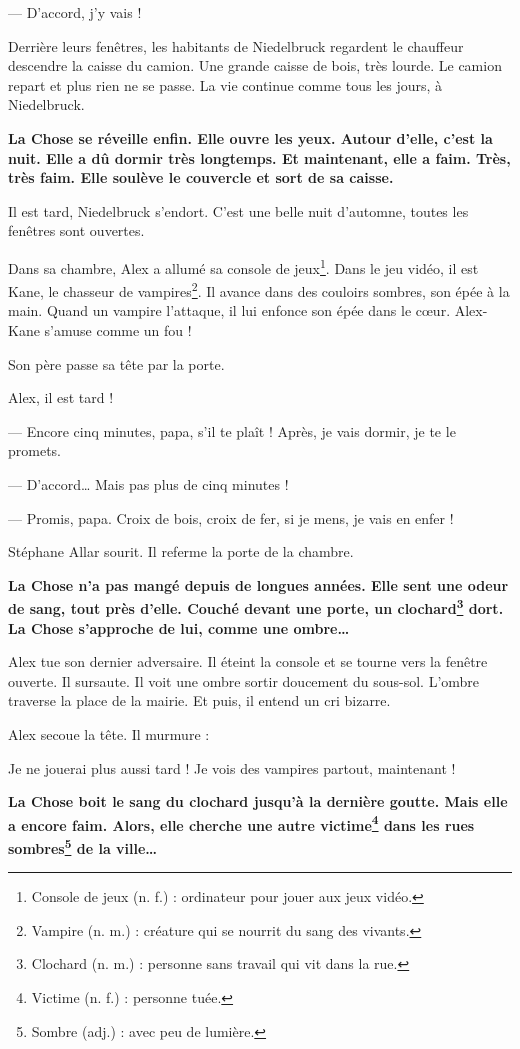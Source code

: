 --- D'accord, j'y vais ! \fg{}

Derrière leurs fenêtres, les habitants de Niedelbruck regardent le chauffeur descendre la caisse du camion. Une grande
caisse de bois, très lourde. Le camion repart et plus rien ne se passe. La vie continue comme tous les jours, à
Niedelbruck.

\textbf{La Chose se réveille enfin. Elle ouvre les yeux. Autour d'elle, c'est la nuit. Elle a dû dormir très longtemps. Et
maintenant, elle a faim. Très, très faim. Elle soulève le couvercle et sort de sa caisse.}

Il est tard, Niedelbruck s'endort. C'est une belle nuit d'automne, toutes les fenêtres sont ouvertes.

Dans sa chambre, Alex a allumé sa console de jeux\footnote{Console de jeux (n. f.) : ordinateur pour jouer aux jeux
vidéo.}. Dans le jeu vidéo, il est Kane, le chasseur de vampires\footnote{Vampire (n. m.) : créature qui se nourrit du
sang des vivants.}. Il avance dans des couloirs sombres, son épée à la main. Quand un vampire l'attaque, il lui enfonce
son épée dans le c\oe{}ur. Alex-Kane s'amuse comme un fou !

Son père passe sa tête par la porte.

\og Alex, il est tard !

--- Encore cinq minutes, papa, s'il te plaît ! Après, je vais dormir, je te le promets.

--- D'accord\ldots{} Mais pas plus de cinq minutes !

--- Promis, papa. Croix de bois, croix de fer, si je mens, je vais en enfer ! \fg{}

Stéphane Allar sourit. Il referme la porte de la chambre.

\textbf{La Chose n'a pas mangé depuis de longues années. Elle sent une odeur de sang, tout près d'elle. Couché devant une porte,
un clochard\footnote{Clochard (n. m.) : personne sans travail qui vit dans la rue.} dort. La Chose s'approche de lui,
comme une ombre\ldots{}}

Alex tue son dernier adversaire. Il éteint la console et se tourne vers la fenêtre ouverte. Il sursaute. Il voit une
ombre sortir doucement du sous-sol. L'ombre traverse la place de la mairie. Et puis, il entend un cri bizarre.

Alex secoue la tête. Il murmure :

\og Je ne jouerai plus aussi tard ! Je vois des vampires partout, maintenant ! \fg{}

\textbf{La Chose boit le sang du clochard jusqu'à la dernière goutte. Mais elle a encore faim. Alors, elle cherche une autre
victime\footnote{Victime (n. f.) : personne tuée.} dans les rues sombres\footnote{Sombre (adj.) : avec peu de lumière.}
de la ville\ldots{}}

